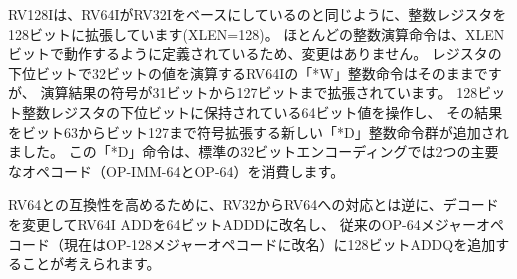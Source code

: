 \begin{comment}
RV128I builds upon RV64I in the same way RV64I builds upon RV32I, with
integer registers extended to 128 bits (i.e., XLEN=128).  Most integer
computational instructions are unchanged as they are defined to
operate on XLEN bits.  The RV64I ``*W'' integer instructions that
operate on 32-bit values in the low bits of a register are retained
but now sign extend their results from bit 31 to bit 127. A new set of
``*D'' integer instructions are added that operate on 64-bit values
held in the low bits of the 128-bit integer registers and sign extend
their results from bit 63 to bit 127.  The ``*D'' instructions consume
two major opcodes (OP-IMM-64 and OP-64) in the standard 32-bit
encoding.
\end{comment}

RV128Iは、RV64IがRV32Iをベースにしているのと同じように、整数レジスタを128ビットに拡張しています(XLEN=128)。
ほとんどの整数演算命令は、XLENビットで動作するように定義されているため、変更はありません。 
レジスタの下位ビットで32ビットの値を演算するRV64Iの「*W」整数命令はそのままですが、
演算結果の符号が31ビットから127ビットまで拡張されています。
128ビット整数レジスタの下位ビットに保持されている64ビット値を操作し、
その結果をビット63からビット127まで符号拡張する新しい「*D」整数命令群が追加されました。
この「*D」命令は、標準の32ビットエンコーディングでは2つの主要なオペコード（OP-IMM-64とOP-64）を消費します。

\begin{commentary}
\begin{comment}
  To improve compatibility with RV64, in a reverse of how RV32 to RV64
  was handled, we might change the decoding around to rename RV64I ADD
  as a 64-bit ADDD, and add a 128-bit ADDQ in what was previously the
  OP-64 major opcode (now renamed the OP-128 major opcode).
\end{comment}

RV64との互換性を高めるために、RV32からRV64への対応とは逆に、デコードを変更してRV64I ADDを64ビットADDDに改名し、
従来のOP-64メジャーオペコード（現在はOP-128メジャーオペコードに改名）に128ビットADDQを追加することが考えられます。
\end{commentary}

\begin{comment}
Shifts by an immediate (SLLI/SRLI/SRAI) are now encoded using the low
7 bits of the I-immediate, and variable shifts (SLL/SRL/SRA) use the
low 7 bits of the shift amount source register.
\end{comment}


